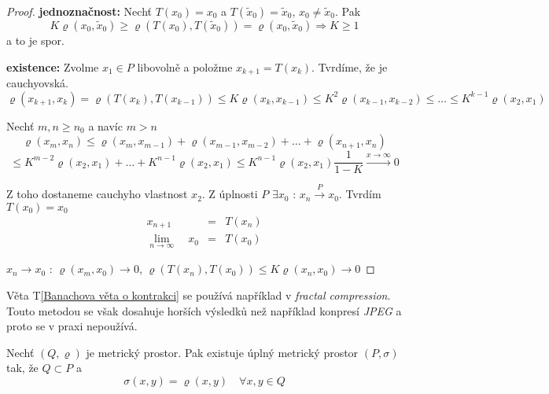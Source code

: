 \begin{proof}
\textbf{jednoznačnost: } Nechť $T(x_0) = x_0$ a $T(\tilde{x}_0) = \tilde{x}_0$, $x_0 \neq \tilde{x}_0$. Pak 
$$K \varrho (x_0, \tilde{x}_0) \geq \varrho (T(x_0),T(\tilde{x}_0)) = \varrho (x_0, \tilde{x}_0) \Rightarrow K \geq 1$$
a to je spor.

\textbf{existence: } Zvolme $x_1 \in P$ libovolně a položme $x_{k+1} = T(x_k)$. Tvrdíme, že je cauchyovská.
$$\varrho( x_{k+1}, x_k ) = \varrho (T(x_k), T(x_{k-1})) \leq K \varrho (x_k,x_{k-1}) \leq K^2 \varrho (x_{k-1},x_{k-2}) \leq \ldots \leq K^{k-1} \varrho (x_2, x_1)$$

Nechť $m,n \geq n_0$ a navíc $m > n$
$$\varrho (x_m, x_n) \leq \varrho (x_m, x_{m-1}) + \varrho (x_{m-1}, x_{m-2}) + \ldots + \varrho (x_{n+1}, x_n) $$
$$\leq K^{m-2} \varrho (x_2, x_1) + \ldots + K^{n-1} \varrho (x_2, x_1) \leq K^{n-1} \varrho (x_2, x_1) \frac{1}{1-K} \overset{x \to \infty}{\to} 0$$

Z toho dostaneme cauchyho vlastnost $x_2$. Z úplnosti $P$ $\exists x_0 \textrm{ : } x_n \overset{P}{\to} x_0$. Tvrdím $T(x_0)=x_0$
\begin{eqnarray*}
x_{n+1} & = & T(x_n) \\
\lim_{n \to \infty} \quad x_0 & = & T(x_0)
\end{eqnarray*}

$x_n \to x_0 \textrm{ : } \varrho (x_m, x_0) \to 0$, $\varrho (T(x_n), T(x_0)) \leq K \varrho (x_n, x_0) \to 0$
\end{proof}

\begin{poznamka}
Věta T\ref{Banachova věta o kontrakci} se používá například v \emph{fractal compression}. Touto metodou se však dosahuje horších výsledků než například konpresí \emph{JPEG} a proto se v praxi nepoužívá.
\end{poznamka}



\begin{vetat}
Nechť $(Q, \varrho)$ je metrický prostor. Pak existuje úplný metrický prostor $(P, \sigma)$ tak, že $Q \subset P$ a 
$$\sigma(x,y) = \varrho(x,y) \quad \forall x,y \in Q$$
\end{vetat}

